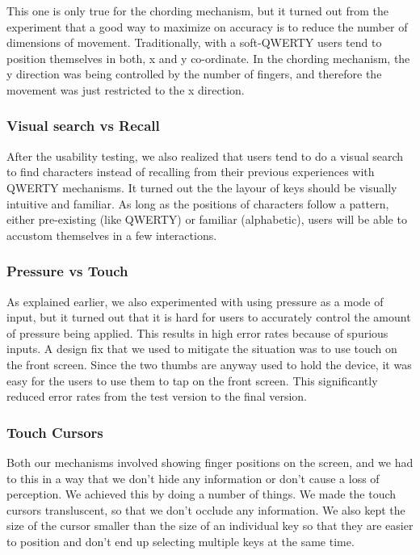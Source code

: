 This one is only true for the chording mechanism, but it turned out
from the experiment that a good way to maximize on accuracy is to
reduce the number of dimensions of movement. Traditionally, with a
soft-QWERTY users tend to position themselves in both, x and y
co-ordinate. In the chording mechanism, the y direction was being
controlled by the number of fingers, and therefore the movement was
just restricted to the x direction.

\subsubsection{Visual search vs Recall}

After the usability testing, we also realized that users tend to do a
visual search to find characters instead of recalling from their
previous experiences with QWERTY mechanisms. It turned out the the
layour of keys should be visually intuitive and familiar. As long as
the positions of characters follow a pattern, either pre-existing
(like QWERTY) or familiar (alphabetic), users will be able to accustom
themselves in a few interactions.

\subsubsection{Pressure vs Touch}

As explained earlier, we also experimented with using pressure as a
mode of input, but it turned out that it is hard for users to
accurately control the amount of pressure being applied. This results
in high error rates because of spurious inputs. A design fix that we
used to mitigate the situation was to use touch on the front
screen. Since the two thumbs are anyway used to hold the device, it
was easy for the users to use them to tap on the front screen. This
significantly reduced error rates from the test version to the final
version.

\subsubsection{Touch Cursors}

Both our mechanisms involved showing finger positions on the screen,
and we had to this in a way that we don't hide any information or
don't cause a loss of perception. We achieved this by doing a number
of things. We made the touch cursors transluscent, so that we don't
occlude any information. We also kept the size of the cursor smaller
than the size of an individual key so that they are easier to position
and don't end up selecting multiple keys at the same time.
